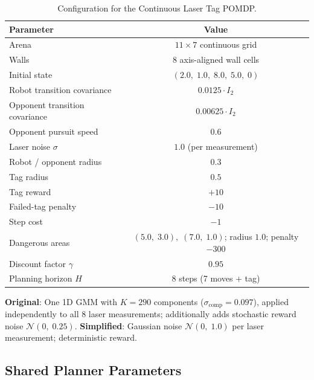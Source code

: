 \documentclass[acmlarge, manuscript, screen, review, natbib=false, oneside]{acmart}
\begin{document}
\begin{table}[ht]
	\centering
	\small
	\setlength{\tabcolsep}{4pt}
	\begin{tabular}{|l|c|}
		\hline
		\textbf{Parameter} & \textbf{Value} \\
		\hline
		Arena & $11 \times 7$ continuous grid \\
		\hline
		Walls & 8 axis-aligned wall cells \\
		\hline
		Initial state & $(2.0,\;1.0,\;8.0,\;5.0,\;0)$ \\
		\hline
		Robot transition covariance & $0.0125 \cdot I_2$ \\
		\hline
		Opponent transition covariance & $0.00625 \cdot I_2$ \\
		\hline
		Opponent pursuit speed & $0.6$ \\
		\hline
		Laser noise $\sigma$ & $1.0$ (per measurement) \\
		\hline
		Robot / opponent radius & $0.3$ \\
		\hline
		Tag radius & $0.5$ \\
		\hline
		Tag reward & $+10$ \\
		\hline
		Failed-tag penalty & $-10$ \\
		\hline
		Step cost & $-1$ \\
		\hline
		Dangerous areas & $(5.0,\;3.0),\;(7.0,\;1.0)$; radius $1.0$; penalty $-300$ \\
		\hline
		Discount factor $\gamma$ & $0.95$ \\
		\hline
		Planning horizon $H$ & $8$ steps (7 moves + tag) \\
		\hline
	\end{tabular}
	\caption{Configuration for the Continuous Laser Tag POMDP.}
	\label{tab:laser_tag_full_config}
\end{table}

\textbf{Original}: One 1D GMM with $K = 290$ components ($\sigma_{\text{comp}} = 0.097$), applied independently to all 8 laser measurements; additionally adds stochastic reward noise $\mathcal{N}(0,\;0.25)$.
\textbf{Simplified}: Gaussian noise $\mathcal{N}(0,\;1.0)$ per laser measurement; deterministic reward.

\subsection{Shared Planner Parameters}
\end{document}

